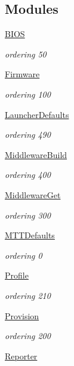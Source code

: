 \subsection*{Modules}
\begin{DoxyCompactItemize}
\item 
\hyperlink{group__BIOS}{B\-I\-O\-S}
\begin{DoxyCompactList}\small\item\em ordering 50 \end{DoxyCompactList}\item 
\hyperlink{group__Firmware}{Firmware}
\begin{DoxyCompactList}\small\item\em ordering 100 \end{DoxyCompactList}\item 
\hyperlink{group__LauncherDefaults}{Launcher\-Defaults}
\begin{DoxyCompactList}\small\item\em ordering 490 \end{DoxyCompactList}\item 
\hyperlink{group__MiddlewareBuild}{Middleware\-Build}
\begin{DoxyCompactList}\small\item\em ordering 400 \end{DoxyCompactList}\item 
\hyperlink{group__MiddlewareGet}{Middleware\-Get}
\begin{DoxyCompactList}\small\item\em ordering 300 \end{DoxyCompactList}\item 
\hyperlink{group__MTTDefaults}{M\-T\-T\-Defaults}
\begin{DoxyCompactList}\small\item\em ordering 0 \end{DoxyCompactList}\item 
\hyperlink{group__Profile}{Profile}
\begin{DoxyCompactList}\small\item\em ordering 210 \end{DoxyCompactList}\item 
\hyperlink{group__Provision}{Provision}
\begin{DoxyCompactList}\small\item\em ordering 200 \end{DoxyCompactList}\item 
\hyperlink{group__Reporter}{Reporter}

\end{DoxyCompactItemize}
